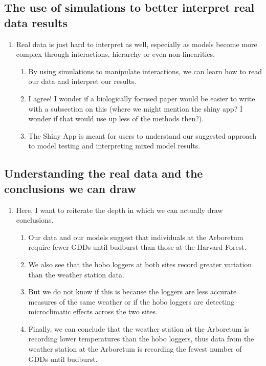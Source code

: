 \documentclass{article}\usepackage[]{graphicx}\usepackage[]{color}
\begin{document}
\subsection*{The use of simulations to better interpret real data results}
\begin{enumerate}
\item Real data is just hard to interpret as well, especially as models become more complex through interactions, hierarchy or even non-linearities. 
  \begin{enumerate}
  \item By using simulations to manipulate interactions, we can learn how to read our data and interpret our results.
  \item I agree! I wonder if a biologically focused paper would be easier to write with a subsection on this (where we might mention the shiny app? I wonder if that would use up less of the methods then?).
  \item The Shiny App is meant for users to understand our suggested approach to model testing and interpreting mixed model results. 
  \end{enumerate}
\end{enumerate}

\subsection*{Understanding the real data and the conclusions we can draw}
\begin{enumerate}
\item Here, I want to reiterate the depth in which we can actually draw conclusions.
  \begin{enumerate}
  \item Our data and our models suggest that individuals at the Arboretum require fewer GDDs until budburst than those at the Harvard Forest.
  \item We also see that the hobo loggers at both sites record greater variation than the weather station data.
  \item But we do not know if this is because the loggers are less accurate measures of the same weather or if the hobo loggers are detecting microclimatic effects across the two sites. 
  \item Finally, we can conclude that the weather station at the Arboretum is recording lower temperatures than the hobo loggers, thus data from the weather station at the Arboretum is recording the fewest number of GDDs until budburst. %
  \end{enumerate}
\end{enumerate}
\end{document}
